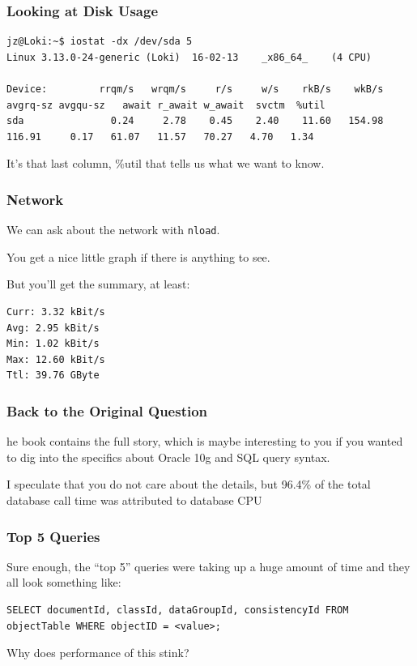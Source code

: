 \begin{frame}[fragile]
\frametitle{Looking at Disk Usage}

{\tiny
\begin{verbatim}
jz@Loki:~$ iostat -dx /dev/sda 5 
Linux 3.13.0-24-generic (Loki) 	16-02-13 	_x86_64_	(4 CPU)

Device:         rrqm/s   wrqm/s     r/s     w/s    rkB/s    wkB/s avgrq-sz avgqu-sz   await r_await w_await  svctm  %util
sda               0.24     2.78    0.45    2.40    11.60   154.98   116.91     0.17   61.07   11.57   70.27   4.70   1.34
\end{verbatim}
}

It's that last column, \%util that tells us what we want to know.

\end{frame}



\begin{frame}[fragile]
\frametitle{Network}

We can ask about the network with \texttt{nload}. 
 
You get a nice little graph if there is anything to see. 

But you'll get the summary, at least:

\begin{verbatim}
Curr: 3.32 kBit/s
Avg: 2.95 kBit/s
Min: 1.02 kBit/s
Max: 12.60 kBit/s
Ttl: 39.76 GByte                                                                                       \end{verbatim}

\end{frame}



\begin{frame}
\frametitle{Back to the Original Question}

he book contains the full story, which is maybe interesting to you if you wanted to dig into the specifics about Oracle 10g and SQL query syntax. 

I speculate that you do not care about the details, but 96.4\% of the total database call time was attributed to database CPU


\end{frame}



\begin{frame}[fragile]
\frametitle{Top 5 Queries}

Sure enough, the ``top 5'' queries were taking up a huge amount of time and they all look something like:

\begin{verbatim}
SELECT documentId, classId, dataGroupId, consistencyId FROM objectTable WHERE objectID = <value>;
\end{verbatim}

Why does performance of this stink?

\end{frame}



